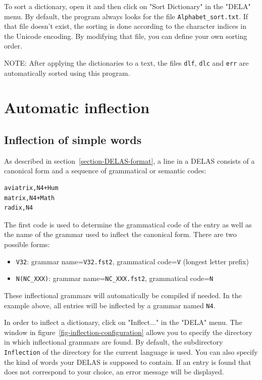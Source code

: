 \bigskip
\noindent To sort a dictionary, open it and then click on "Sort Dictionary" in
 the "DELA" menu. By default, the program always looks for the file
\verb+Alphabet_sort.txt+. If that file doesn't exist, the sorting is done
according to the character indices in the Unicode encoding. By modifying that
file, you can define your own sorting order.

\bigskip
\noindent NOTE: After applying the dictionaries to a text, the files
\verb+dlf+, \verb+dlc+ and \verb+err+ are automatically sorted using this
program.  



\section{Automatic inflection}
\label{section-automatic-inflection}
\subsection{Inflection of simple words}

As described in section~\ref{section-DELAS-format}, a line in a DELAS
consists of a canonical form and a sequence of grammatical or semantic codes:

\begin{verbatim}
aviatrix,N4+Hum
matrix,N4+Math
radix,N4
\end{verbatim}

\bigskip
\noindent The first code is used to determine the grammatical code of the entry as
well as the name of the grammar used to inflect the canonical form. There are
two possible forms:

\begin{itemize}
  \item \verb+V32+: grammar name=\verb+V32.fst2+, grammatical code=\verb+V+
  (longest letter prefix)
  \item \verb+N(NC_XXX)+: grammar name=\verb+NC_XXX.fst2+, grammatical code=\verb+N+
\end{itemize}

\bigskip
\noindent These inflectional grammars  will automatically be
compiled if needed. In the example above, all entries will be inflected by a grammar named \verb+N4+.

\bigskip
\noindent In order to  inflect a dictionary, click on "Inflect..." in the "DELA" menu. The
window in figure~\ref{fig-inflection-configuration} allows you to specify the
directory in which inflectional grammars are found. By default, the subdirectory
\verb+Inflection+ of the directory for the current language is used. You can
also specify the kind of words your DELAS is supposed to contain. If an entry is
found that does not correspond to your choice, an error message will be
displayed.

